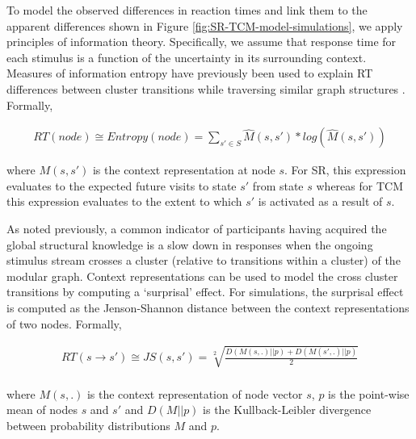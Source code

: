 To model the observed differences in reaction times and link them to the apparent differences shown in Figure \ref{fig:SR-TCM-model-simulations}, we apply principles of information theory. Specifically, we assume that response time for each stimulus is a function of the uncertainty in its surrounding context. Measures of information entropy have previously been used to explain RT differences between cluster transitions while traversing similar graph structures \cite{lynn2020abstract, lynn2020human,lynn2020humans}. Formally, 

\begin{equation}
	\begin{aligned}
		RT(node) \cong Entropy(node) = \sum_{s' \in S} \hat{M}(s, s') * log(\hat{M}(s, s'))
	\end{aligned}
\end{equation}

where $M(s, s')$ is the context representation at node $s$. For SR, this expression evaluates to the expected future visits to state $s'$ from state $s$ whereas for TCM this expression evaluates to the extent to which $s'$ is activated as a result of $s$. 

As noted previously, a common indicator of participants having acquired the global structural knowledge is a slow down in responses when the ongoing stimulus stream crosses a cluster (relative to transitions within a cluster) of the modular graph. Context representations can be used to model the cross cluster transitions by computing a `surprisal' effect. For simulations, the surprisal effect is computed as the Jenson-Shannon distance between the context representations of two nodes. Formally, 

\begin{equation}
	\begin{aligned}
		RT(s \rightarrow s') \cong JS(s, s') = \sqrt[2]{\frac{D(M(s, .) || p) + D(M(s', .) || p)}{2}} \\
	\end{aligned}
\end{equation}

where $M(s, .)$ is the context representation of node vector $s$, $p$ is the point-wise mean of nodes $s$ and $s'$ and $D(M||p)$ is the Kullback-Leibler divergence between probability distributions $M$ and $p$. 

